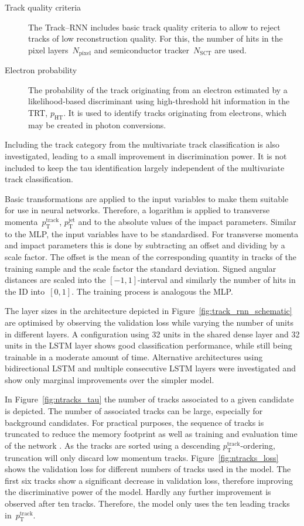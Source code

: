 \begin{description}
\item[Track quality criteria] The Track--RNN includes basic track quality
  criteria to allow to reject tracks of low reconstruction quality. For this,
  the number of hits in the pixel layers~$N_\text{pixel}$ and semiconductor
  tracker~$N_\text{SCT}$ are used.

\item[Electron probability] The probability of the track originating from an
  electron estimated by a likelihood-based discriminant using high-threshold hit
  information in the TRT, $p_\text{HT}$. It is used to identify tracks
  originating from electrons, which may be created in photon conversions.
\end{description}
Including the track category from the multivariate track classification is also
investigated, leading to a small improvement in discrimination power. It is not
included to keep the tau identification largely independent of the multivariate
track classification.

Basic transformations are applied to the input variables to make them suitable
for use in neural networks. Therefore, a logarithm is applied to transverse
momenta~$p_\text{T}^\text{track}$, $p_\text{T}^\text{jet}$ and to the absolute
values of the impact parameters. Similar to the MLP, the input variables have to
be standardised. For transverse momenta and impact parameters this is done by
subtracting an offset and dividing by a scale factor. The offset is the mean of
the corresponding quantity in tracks of the training sample and the scale factor
the standard deviation. Signed angular distances are scaled into the
$[-1, 1]$-interval and similarly the number of hits in the ID into~$[0, 1]$. The
training process is analogous the MLP.

The layer sizes in the architecture depicted in
Figure~\ref{fig:track_rnn_schematic} are optimised by observing the validation
loss while varying the number of units in different layers. A configuration
using 32 units in the shared dense layer and 32 units in the LSTM layer shows
good classification performance, while still being trainable in a moderate
amount of time. Alternative architectures using bidirectional LSTM and multiple
consecutive LSTM layers were investigated and show only marginal improvements
over the simpler model.

In Figure~\ref{fig:ntracks_tau} the number of tracks associated to a given
\tauhadvis candidate is depicted. The number of associated tracks can be large,
especially for background candidates. For practical purposes, the sequence of
tracks is truncated to reduce the memory footprint as well as training and
evaluation time of the network . As the tracks are sorted using
a descending $p_\text{T}^\text{track}$-ordering, truncation will only discard
low momentum tracks. Figure~\ref{fig:ntracks_loss} shows the validation loss for
different numbers of tracks used in the model. The first six tracks show a
significant decrease in validation loss, therefore improving the discriminative
power of the model. Hardly any further improvement is observed after ten tracks.
Therefore, the model only uses the ten leading tracks
in~$p_\text{T}^\text{track}$.

